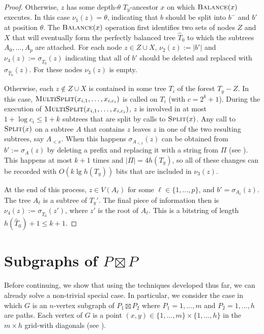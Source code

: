 \documentclass[kpfonts]{patmorin}
\let\le\leqslant
\begin{document}
\begin{proof}
  Otherwise, $z$ has some depth-$\theta$ $T_y$-ancestor $x$ on which $\textsc{Balance}(x)$ executes. In this case $\nu_{1}(z)=\theta$, indicating that $b$ should be split into $b^-$ and $b'$ at position $\theta$.  
  The $\textsc{Balance}(x)$ operation first identifies two sets of nodes $Z$ and $X$ that will eventually form the perfectly balanced tree $\hat{T}_0$ to which the subtrees $A_0,\ldots,A_p$ are attached.  For each node $z\in Z\cup X$, $\nu_{2}(z):=|b'|$ and $\nu_{4}(z):=\sigma_{\hat{T}_0}(z)$ indicating that all of $b'$ should be deleted and replaced with $\sigma_{\hat{T}_0}(z)$.  For these nodes $\nu_3(z)$ is empty.
    
  Otherwise, each $z\not\in Z\cup X$ is contained in some tree $T_i$ of the forest $T_y-Z$.  In this case, $\textsc{MultiSplit}(x_{i,1},\ldots,x_{i,c_i})$ is called on $T_i$ (with $c=2^k+1$).  During the execution of $\textsc{MultiSplit}(x_{i,1},\ldots,x_{i,c_i})$, $z$ is involved in at most $1+\log c_i\le 1+k$ subtrees that are split by calls to $\textsc{Split}(x)$.  Any call to $\textsc{Split}(x)$ on a subtree $A$ that contains $z$ leaves $z$ in one of the two resulting subtrees, say $A_{<x}$.  When this happens $\sigma_{A_{<x}}(z)$ can be obtained from $b':=\sigma_{A}(z)$ by deleting a prefix and replacing it with a string from $\Pi$ (see ).  This happens at most $k+1$ times and $|\Pi|= 4h(T_y)$, so all of these changes can be recorded with $O(k\lg h(T_y))$ bits that are included in $\nu_{3}(z)$.
  
  At the end of this process, $z\in V(A_\ell)$ for some $\ell\in\{1,\ldots,p\}$, and $b'=\sigma_{A_\ell}(z)$.  The tree $A_\ell$ is a subtree of $T_y'$.  The final piece of information then is $\nu_4(z):=\sigma_{\hat{T}_0}(z')$, where $z'$ is the root of $A_\ell$.  This is a bitstring of length $h(\hat{T}_0)+1\le k+1$.
\end{proof}

\section{Subgraphs of $P\boxtimes P$}

Before continuing, we show that using the techniques developed thus far, we can already solve a non-trivial special case.  In particular, we consider the case in which $G$ is an $n$-vertex subgraph of $P_1\boxtimes P_2$ where $P_1=1,\ldots,m$ and $P_2=1,\ldots,h$ are paths. Each vertex of $G$ is a point $(x,y)\in\{1,\ldots,m\}\times \{1,\ldots,h\}$ in the $m\times h$ grid-with diagonals (see ).
\end{document}
